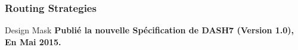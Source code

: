 \documentclass[8pt]{beamer}
\newcommand{\1}{\mathbbm 1}
\begin{document}
\subsubsection{Routing Strategies}
\begin{frame}{Design Mask}
\textbf{Publié la nouvelle Spécification de DASH7 (Version 1.0), En Mai 2015.}
\begin{figure}
\end{figure}
\end{frame}
\end{document}
